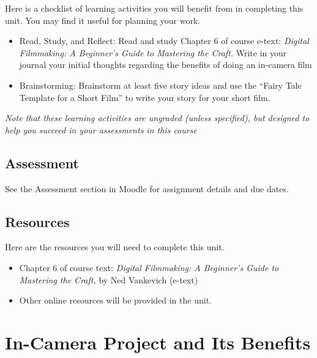 \documentclass[
]{book}
\providecommand{\tightlist}{%
  \setlength{\itemsep}{0pt}\setlength{\parskip}{0pt}}
\begin{document}
\begin{reflect}
Here is a checklist of learning activities you will benefit from in completing this unit. You may find it useful for planning your work.

\begin{itemize}
\tightlist
\item
  Read, Study, and Reflect: Read and study Chapter 6 of course e-text: \emph{Digital Filmmaking: A Beginner's Guide to Mastering the Craft.} Write in your journal your initial thoughts regarding the benefits of doing an in-camera film
\item
  Brainstorming: Brainstorm at least five story ideas and use the ``Fairy Tale Template for a Short Film'' to write your story for your short film.
\end{itemize}

\emph{Note that these learning activities are ungraded (unless specified), but designed to help you succeed in your assessments in this course}
\end{reflect}

\hypertarget{assessment-10}{%
\subsection*{Assessment}\label{assessment-10}}

See the Assessment section in Moodle for assignment details and due dates.

\hypertarget{resources-5}{%
\subsection*{Resources}\label{resources-5}}

Here are the resources you will need to complete this unit.

\begin{itemize}
\tightlist
\item
  Chapter 6 of course text: \emph{Digital Filmmaking: A Beginner's Guide to Mastering the Craft,} by Ned Vankevich (e-text)
\item
  Other online resources will be provided in the unit.
\end{itemize}

\hypertarget{in-camera-project-and-its-benefits}{%
\section{In-Camera Project and Its Benefits}\label{in-camera-project-and-its-benefits}}
\end{document}
